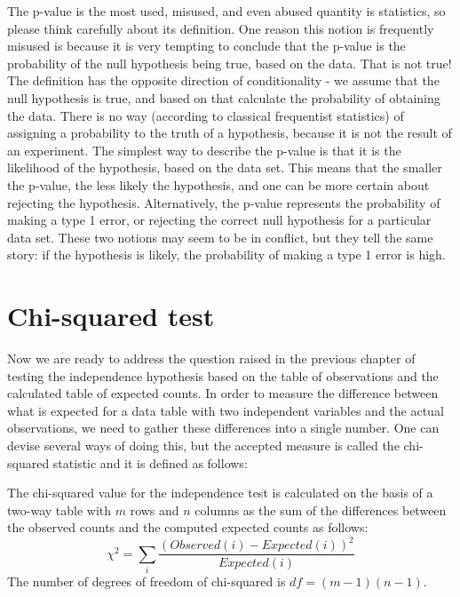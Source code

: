 \documentclass[
  letterpaper,
  DIV=11,
  numbers=noendperiod]{scrreprt}
\begin{document}
The p-value is the most used, misused, and even abused quantity is
statistics, so please think carefully about its definition. One reason
this notion is frequently misused is because it is very tempting to
conclude that the p-value is the probability of the null hypothesis
being true, based on the data. That is not true! The definition has the
opposite direction of conditionality - we assume that the null
hypothesis is true, and based on that calculate the probability of
obtaining the data. There is no way (according to classical frequentist
statistics) of assigning a probability to the truth of a hypothesis,
because it is not the result of an experiment. The simplest way to
describe the p-value is that it is the likelihood of the hypothesis,
based on the data set. This means that the smaller the p-value, the less
likely the hypothesis, and one can be more certain about rejecting the
hypothesis. Alternatively, the p-value represents the probability of
making a type 1 error, or rejecting the correct null hypothesis for a
particular data set. These two notions may seem to be in conflict, but
they tell the same story: if the hypothesis is likely, the probability
of making a type 1 error is high.

\hypertarget{chi-squared-test-1}{%
\section{Chi-squared test}\label{chi-squared-test-1}}

Now we are ready to address the question raised in the previous chapter
of testing the independence hypothesis based on the table of
observations and the calculated table of expected counts. In order to
measure the difference between what is expected for a data table with
two independent variables and the actual observations, we need to gather
these differences into a single number. One can devise several ways of
doing this, but the accepted measure is called the chi-squared statistic
and it is defined as follows:

\begin{tcolorbox}[enhanced jigsaw, arc=.35mm, colframe=quarto-callout-note-color-frame, left=2mm, opacitybacktitle=0.6, breakable, title=\textcolor{quarto-callout-note-color}{\faInfo}\hspace{0.5em}{Definition}, toprule=.15mm, coltitle=black, bottomtitle=1mm, toptitle=1mm, colback=white, leftrule=.75mm, colbacktitle=quarto-callout-note-color!10!white, titlerule=0mm, opacityback=0, rightrule=.15mm, bottomrule=.15mm]

The chi-squared value for the independence test is calculated on the
basis of a two-way table with \(m\) rows and \(n\) columns as the sum of
the differences between the observed counts and the computed expected
counts as follows:
\[\chi^2= \sum_i \frac{(Observed(i)-Expected(i))^2}{Expected(i)}\] The
number of degrees of freedom of chi-squared is \(df = (m-1)(n-1)\).

\end{tcolorbox}
\end{document}
